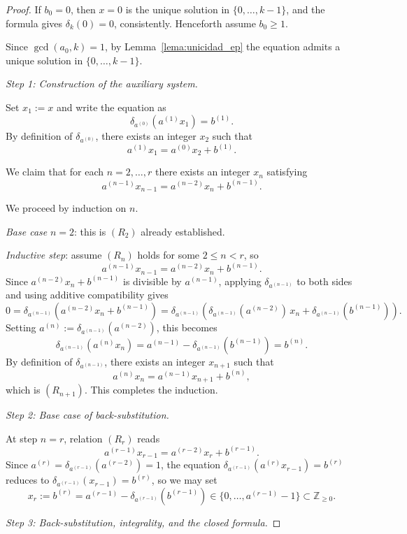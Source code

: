 \documentclass[12pt]{article}
\begin{document}
\begin{proof}
If $b_0 = 0$, then $x = 0$ is the unique solution in $\{0,\dots,k-1\}$,
and the formula gives $\delta_k(0) = 0$, consistently.
Henceforth assume $b_0 \ge 1$.

Since $\gcd(a_0,k)=1$, by Lemma~\ref{lema:unicidad_ep} the equation
admits a unique solution in $\{0,\dots,k-1\}$.

\medskip
\textit{Step 1: Construction of the auxiliary system.}

Set $x_1 := x$ and write the equation as
\[
\delta_{a^{(0)}}(a^{(1)} x_1) = b^{(1)}.
\]
By definition of $\delta_{a^{(0)}}$, there exists an integer $x_2$ such
that
\[
a^{(1)} x_1 = a^{(0)} x_2 + b^{(1)}.
\tag{$R_2$}
\]

We claim that for each $n = 2, \dots, r$ there exists an integer $x_n$
satisfying
\[
a^{(n-1)} x_{n-1} = a^{(n-2)} x_n + b^{(n-1)}.
\tag{$R_n$}
\]

We proceed by induction on $n$.

\textit{Base case} $n = 2$: this is $(R_2)$ already established.

\textit{Inductive step}: assume $(R_n)$ holds for some $2 \le n < r$,
so
\[
a^{(n-1)} x_{n-1} = a^{(n-2)} x_n + b^{(n-1)}.
\]
Since $a^{(n-2)} x_n + b^{(n-1)}$ is divisible by $a^{(n-1)}$,
applying $\delta_{a^{(n-1)}}$ to both sides and using additive
compatibility gives
\[
0 = \delta_{a^{(n-1)}}\!\left(a^{(n-2)} x_n + b^{(n-1)}\right)
  = \delta_{a^{(n-1)}}\!\left(\delta_{a^{(n-1)}}(a^{(n-2)})\, x_n
    + \delta_{a^{(n-1)}}(b^{(n-1)})\right).
\]
Setting $a^{(n)} := \delta_{a^{(n-1)}}(a^{(n-2)})$, this becomes
\[
\delta_{a^{(n-1)}}(a^{(n)} x_n) = a^{(n-1)} - \delta_{a^{(n-1)}}(b^{(n-1)})
= b^{(n)}.
\]
By definition of $\delta_{a^{(n-1)}}$, there exists an integer $x_{n+1}$
such that
\[
a^{(n)} x_n = a^{(n-1)} x_{n+1} + b^{(n)},
\]
which is $(R_{n+1})$. This completes the induction.

\medskip
\textit{Step 2: Base case of back-substitution.}

At step $n = r$, relation $(R_r)$ reads
\[
a^{(r-1)} x_{r-1} = a^{(r-2)} x_r + b^{(r-1)}.
\]
Since $a^{(r)} = \delta_{a^{(r-1)}}(a^{(r-2)}) = 1$, the equation
$\delta_{a^{(r-1)}}(a^{(r)} x_{r-1}) = b^{(r)}$ reduces to
$\delta_{a^{(r-1)}}(x_{r-1}) = b^{(r)}$,
so we may set
\[
x_r := b^{(r)} = a^{(r-1)} - \delta_{a^{(r-1)}}(b^{(r-1)})
\in \{0, \dots, a^{(r-1)}-1\} \subset \mathbb{Z}_{\ge 0}.
\]

\medskip
\textit{Step 3: Back-substitution, integrality, and the closed formula.}


\end{proof}
\end{document}

